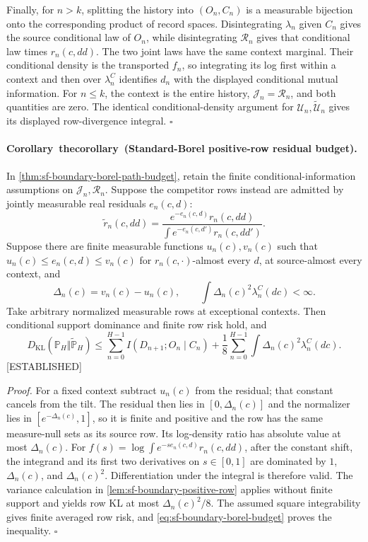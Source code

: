 \documentclass[11pt,letterpaper]{report}
\newcommand{\KL}{D_{\mathrm{KL}}}
\newcounter{statementsequence}[chapter]
\newcommand{\syncstatementcounter}[1]{\stepcounter{statementsequence}\setcounter{#1}{\numexpr\value{statementsequence}-1\relax}\refstepcounter{#1}}
\newcommand{\resultheading}[4]{\syncstatementcounter{#2}\label{#4}\paragraph{#1~\csname the#2\endcsname\ (#3).}}
\newcommand{\corollaryheading}[2]{\resultheading{Corollary}{corollary}{#1}{#2}}
\newcommand{\status}[1]{\mbox{{\small\textsc{\textcolor{red!45!black}{[#1]}}}}}
\begin{document}
Finally, for $n>k$, splitting the history into $(O_n,C_n)$ is a measurable bijection onto the corresponding product of record spaces. Disintegrating $\lambda_n$ given $C_n$ gives the source conditional law of $O_n$, while disintegrating $\mathcal R_n$ gives that conditional law times $r_n(c,dd)$. The two joint laws have the same context marginal. Their conditional density is the transported $f_n$, so integrating its log first within a context and then over $\lambda_n^C$ identifies $d_n$ with the displayed conditional mutual information. For $n\le k$, the context is the entire history, $\mathcal J_n=\mathcal R_n$, and both quantities are zero. The identical conditional-density argument for $\mathcal U_n,\widetilde{\mathcal U}_n$ gives its displayed row-divergence integral. $\square$

\corollaryheading{Standard-Borel positive-row residual budget}{cor:sf-boundary-borel-positive-row}
In \cref{thm:sf-boundary-borel-path-budget}, retain the finite conditional-information assumptions on $\mathcal J_n,\mathcal R_n$. Suppose the competitor rows instead are admitted by jointly measurable real residuals $e_n(c,d)$:
\[
 \widetilde r_n(c,dd)
  =\frac{e^{-e_n(c,d)}r_n(c,dd)}
         {\int e^{-e_n(c,d')}r_n(c,dd')}.
\]
Suppose there are finite measurable functions $u_n(c),v_n(c)$ such that $u_n(c)\le e_n(c,d)\le v_n(c)$ for $r_n(c,\cdot)$-almost every $d$, at source-almost every context, and
\[
 \Delta_n(c)=v_n(c)-u_n(c),
 \qquad \int\Delta_n(c)^2\lambda_n^C(dc)<\infty.
\]
Take arbitrary normalized measurable rows at exceptional contexts. Then conditional support dominance and finite row risk hold, and
\[
 \KL(\mathbb P_H\Vert\widetilde{\mathbb P}_H)
 \le\sum_{n=0}^{H-1}I(D_{n+1};O_n\mid C_n)
    +\frac18\sum_{n=0}^{H-1}
                    \int\Delta_n(c)^2\lambda_n^C(dc).
 \label{eq:sf-boundary-borel-residual-budget}
\]
\status{ESTABLISHED}

\noindent\emph{Proof.}
For a fixed context subtract $u_n(c)$ from the residual; that constant cancels from the tilt. The residual then lies in $[0,\Delta_n(c)]$ and the normalizer lies in $[e^{-\Delta_n(c)},1]$, so it is finite and positive and the row has the same measure-null sets as its source row. Its log-density ratio has absolute value at most $\Delta_n(c)$. For $f(s)=\log\int e^{-s e_n(c,d)}r_n(c,dd)$, after the constant shift, the integrand and its first two derivatives on $s\in[0,1]$ are dominated by $1$, $\Delta_n(c)$, and $\Delta_n(c)^2$. Differentiation under the integral is therefore valid. The variance calculation in \cref{lem:sf-boundary-positive-row} applies without finite support and yields row KL at most $\Delta_n(c)^2/8$. The assumed square integrability gives finite averaged row risk, and \cref{eq:sf-boundary-borel-budget} proves the inequality. $\square$
\end{document}

